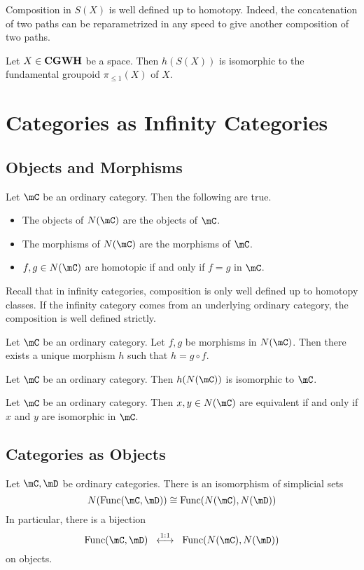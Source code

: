 \documentclass[a4paper]{article}
\begin{document}
Composition in $S(X)$ is well defined up to homotopy. Indeed, the concatenation of two paths can be reparametrized in any speed to give another composition of two paths. 

\begin{prp}{}{} Let $X\in\bold{CGWH}$ be a space. Then $h(S(X))$ is isomorphic to the fundamental groupoid $\pi_{\leq 1}(X)$ of $X$. 
\end{prp}

\pagebreak
\section{Categories as Infinity Categories}
\subsection{Objects and Morphisms}
\begin{prp}{}{} Let $\mC$ be an ordinary category. Then the following are true. 
\begin{itemize}
\item The objects of $N(\mC)$ are the objects of $\mC$. 
\item The morphisms of $N(\mC)$ are the morphisms of $\mC$. 
\item $f,g\in N(\mC)$ are homotopic if and only if $f=g$ in $\mC$. 
\end{itemize}
\end{prp}

Recall that in infinity categories, composition is only well defined up to homotopy classes. If the infinity category comes from an underlying ordinary category, the composition is well defined strictly. 

\begin{prp}{}{} Let $\mC$ be an ordinary category. Let $f,g$ be morphisms in $N(\mC)$. Then there exists a unique morphism $h$ such that $h=g\circ f$. 
\end{prp}

\begin{prp}{}{} Let $\mC$ be an ordinary category. Then $h(N(\mC))$ is isomorphic to $\mC$. 
\end{prp}

\begin{prp}{}{} Let $\mC$ be an ordinary category. Then $x,y\in N(\mC)$ are equivalent if and only if $x$ and $y$ are isomorphic in $\mC$. 
\end{prp}

\subsection{Categories as Objects}
\begin{prp}{}{} Let $\mC,\mD$ be ordinary categories. There is an isomorphism of simplicial sets $$N(\text{Func}(\mC,\mD))\cong\text{Func}(N(\mC),N(\mD))$$ In particular, there is a bijection $$\text{Func}(\mC,\mD)\;\;\overset{1:1}{\longleftrightarrow}\;\;\text{Func}(N(\mC),N(\mD))$$ on objects. 
\end{prp}
\end{document}
